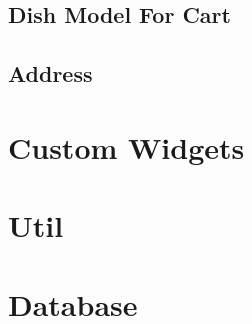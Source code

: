 \subsection{Dish Model For Cart}

\subsection{Address}

\section{Custom Widgets}

\section{Util}

\section{Database}
